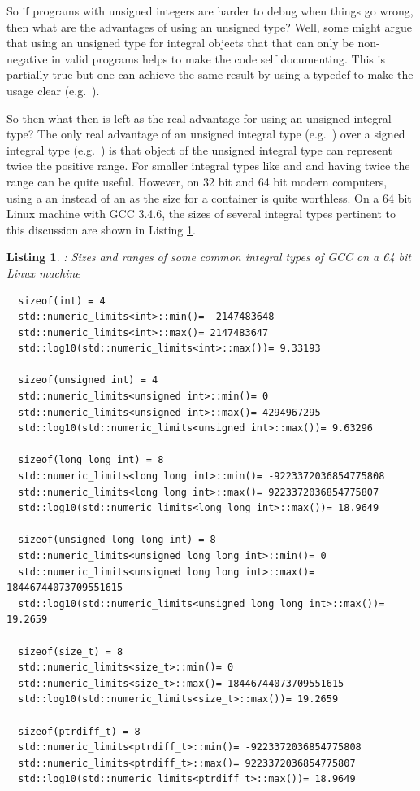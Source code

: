 \documentclass[pdf,ps2pdf,11pt]{SANDreport}
\newtheorem{listing}{Listing}
\begin{document}
So if programs with unsigned integers are harder to debug when things
go wrong, then what are the advantages of using an unsigned type?
Well, some might argue that using an unsigned type for integral
objects that that can only be non-negative in valid programs helps to
make the code self documenting.  This is partially true but one can
achieve the same result by using a typedef to make the usage clear
(e.g.\ {}).

So then what then is left as the real advantage for using an unsigned
integral type?  The only real advantage of an unsigned integral type
(e.g.\ {}) over a signed integral type (e.g.\
{}) is that object of the unsigned integral type can
represent twice the positive range.  For smaller integral types like
{}\ttt{char} and and {}\ttt{short int} having twice the range can be
quite useful.  However, on 32 bit and 64 bit modern computers, using a
an {}\ttt{unsigned int} instead of an {}\ttt{int} as the size for a
container is quite worthless.  On a 64 bit Linux machine with GCC
3.4.6, the sizes of several integral types pertinent to this
discussion are shown in Listing {}\ref{listing:integral-type-sizes}.


{}\begin{listing}: Sizes and ranges of some common integral types of
GCC on a 64 bit Linux machine
\label{listing:integral-type-sizes}
{\small\begin{verbatim}
  sizeof(int) = 4
  std::numeric_limits<int>::min()= -2147483648
  std::numeric_limits<int>::max()= 2147483647
  std::log10(std::numeric_limits<int>::max())= 9.33193
  
  sizeof(unsigned int) = 4
  std::numeric_limits<unsigned int>::min()= 0
  std::numeric_limits<unsigned int>::max()= 4294967295
  std::log10(std::numeric_limits<unsigned int>::max())= 9.63296
  
  sizeof(long long int) = 8
  std::numeric_limits<long long int>::min()= -9223372036854775808
  std::numeric_limits<long long int>::max()= 9223372036854775807
  std::log10(std::numeric_limits<long long int>::max())= 18.9649
  
  sizeof(unsigned long long int) = 8
  std::numeric_limits<unsigned long long int>::min()= 0
  std::numeric_limits<unsigned long long int>::max()= 18446744073709551615
  std::log10(std::numeric_limits<unsigned long long int>::max())= 19.2659
  
  sizeof(size_t) = 8
  std::numeric_limits<size_t>::min()= 0
  std::numeric_limits<size_t>::max()= 18446744073709551615
  std::log10(std::numeric_limits<size_t>::max())= 19.2659
  
  sizeof(ptrdiff_t) = 8
  std::numeric_limits<ptrdiff_t>::min()= -9223372036854775808
  std::numeric_limits<ptrdiff_t>::max()= 9223372036854775807
  std::log10(std::numeric_limits<ptrdiff_t>::max())= 18.9649
\end{verbatim}}
\end{listing}
\end{document}
